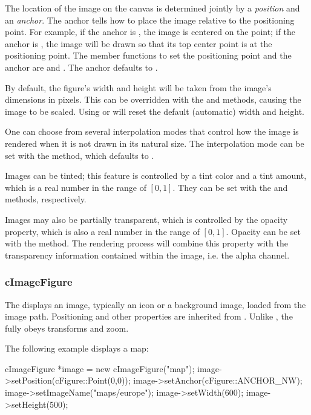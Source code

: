 The location of the image on the canvas is determined jointly by a
\textit{position} and an \textit{anchor}. The anchor tells how to
place the image relative to the positioning point. For example,
if the anchor is , the image is centered on the point;
if the anchor is , the image will be drawn so that its top
center point is at the positioning point. The member functions to set the
positioning point and the anchor are  and
. The anchor defaults to .

By default, the figure's width and height will be taken from the image's
dimensions in pixels. This can be overridden with the  and
 methods, causing the image to be scaled. Using
 or  will reset the default (automatic) width
and height.

One can choose from several interpolation modes that control how the image
is rendered when it is not drawn in its natural size. The interpolation mode
can be set with the  method, which defaults to
.

Images can be tinted; this feature is controlled by a tint color and a tint
amount, which is a real number in the range of $[0,1]$. They can be set with the
 and  methods, respectively.

Images may also be partially transparent, which is controlled by the opacity
property, which is also a real number in the range of $[0,1]$. Opacity can be set with the
 method. The rendering process will combine this
property with the transparency information contained within the image, i.e.
the alpha channel.


\subsubsection{cImageFigure}
\label{sec:graphics:imagefigure}

The  displays an image, typically an icon or a background
image, loaded from the {\opp} image path. Positioning and other properties
are inherited from . Unlike ,
the  fully obeys transforms and zoom.

The following example displays a map:

\begin{cpp}
cImageFigure *image = new cImageFigure("map");
image->setPosition(cFigure::Point(0,0));
image->setAnchor(cFigure::ANCHOR_NW);
image->setImageName("maps/europe");
image->setWidth(600);
image->setHeight(500);
\end{cpp}

